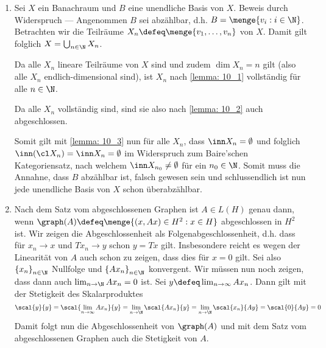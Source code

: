 \begin{exercisePage}
 
 	\begin{enumerate}[label=(zu \alph*), leftmargin=*]
 		\item Sei $X$ ein Banachraum und $B$ eine unendliche Basis von $X$. Beweis durch Widerspruch --- Angenommen $B$ sei abzählbar, d.h. $B = \menge{v_i : i \in \N}$. Betrachten wir die Teilräume $X_n \defeq \menge{v_1, \dots, v_n}$ von $X$. Damit gilt folglich $X = \bigcup_{n \in \N} X_n$. 
 		
 		Da alle $X_n$ lineare Teilräume von $X$ sind und zudem $\dim X_n = n$ gilt (also alle $X_n$ endlich-dimensional sind), ist $X_n$ nach \cref{lemma: 10_1} vollständig für alle $n \in \N$.
 	
 		Da alle $X_n$ vollständig sind, sind sie also nach \cref{lemma: 10_2} auch abgeschlossen.
 		
 		Somit gilt mit \cref{lemma: 10_3} nun für alle $X_n$, dass $\inn X_n = \emptyset$ und folglich $\inn (\cl X_n) = \inn X_n = \emptyset$ im Widerspruch zum Baire'schen Kategoriensatz, nach welchem $\inn X_{n_0} \neq \emptyset$ für ein $n_0 \in \N$. Somit muss die Annahne, dass $B$ abzählbar ist, falsch gewesen sein und schlussendlich ist nun jede unendliche Basis von $X$ schon überabzählbar.
 		\item Nach dem Satz vom abgeschlossenen Graphen ist $A \in L(H)$ genau dann, wenn $\graph(A) \defeq \menge{(x,Ax) \in H^2: x \in H}$ abgeschlossen in $H^2$ ist. Wir zeigen die Abgeschlossenheit als Folgenabgeschlossenheit, d.h. dass für $x_n \to x$ und $Tx_n \to y$ schon $y = Tx$ gilt. Insbesondere reicht es wegen der Linearität von $A$ auch schon zu zeigen, dass dies für $x=0$ gilt. Sei also $\folge{x_n}{n \in \N}$ Nullfolge und $\folge{Ax_n}{n \in \N}$ konvergent. Wir müssen nun noch zeigen, dass dann auch $\lim_{n \to \N} Ax_n = 0$ ist. Sei $y \defeq \lim_{n \to \infty} A x_n$. Dann gilt mit der Stetigkeit des Skalarproduktes 
 		\begin{equation*}
 			\scal{y}{y} = \scal{\lim_{n \to \infty} Ax_n}{y} = \lim_{n \to \N} \scal{Ax_n}{y} = \lim_{n \to \N} \scal{x_n}{Ay} = \scal{0}{Ay} = 0
 		\end{equation*}
 		Damit folgt nun die Abgeschlossenheit von $\graph(A)$ und mit dem Satz vom abgeschlossenen Graphen auch die Stetigkeit von $A$.
 		

\end{enumerate}
\end{exercisePage}
